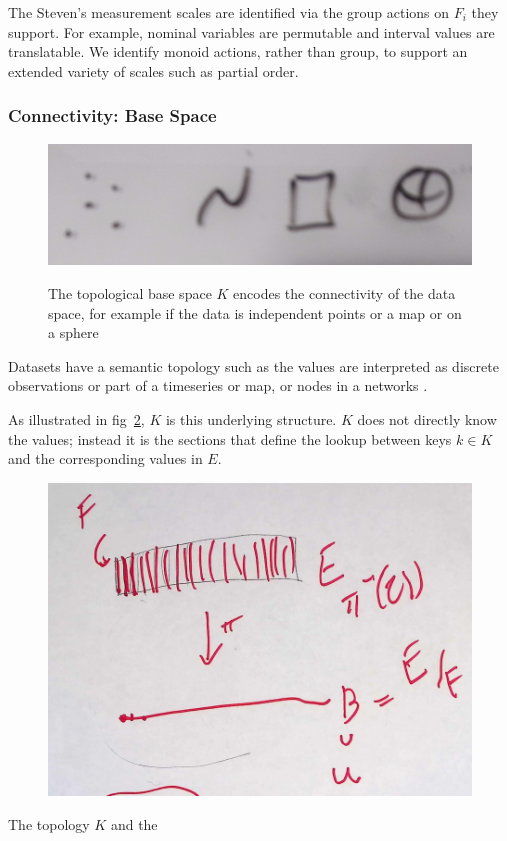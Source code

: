 \documentclass[../main.tex]{subfiles}
\begin{document}
The Steven's measurement scales are identified via the group actions on $F_{i}$  \cite{stevensTheoryScalesMeasurement1946, leaFormalizationMeasurementScale} they support. For example, nominal variables are permutable and interval values are translatable. We identify monoid actions, rather than group, to support an extended variety of scales such as partial order. 

\subsubsection{Connectivity: Base Space} 

\label{sec:base_data}
\begin{figure}[h!]
    \includegraphics[width=\textwidth]{figures/math/k_different_types.png}
    \label{fig:base_space_types}
    \caption{The topological base space $K$ encodes the connectivity of the data space, for example if the data is independent points or a map or on a sphere}
\end{figure}

Datasets have a semantic topology such as the values are interpreted as discrete observations or part of a timeseries or map, or nodes in a networks \cite{munznerWhatDataAbstraction2014,geveci2012vtk}. %

As illustrated in fig~\ref{fig:base_space_div}, $K$ is this underlying structure. $K$ does not directly know the values; instead it is the sections that define the lookup between keys $k \in K$ and the corresponding values in $E$.

\begin{figure}[h!]
    \label{fig:base_space_div}
    \includegraphics[width=.5\linewidth]{figures/math/k_qspace.png}
\end{figure}
The topology $K$ and the
\end{document}
